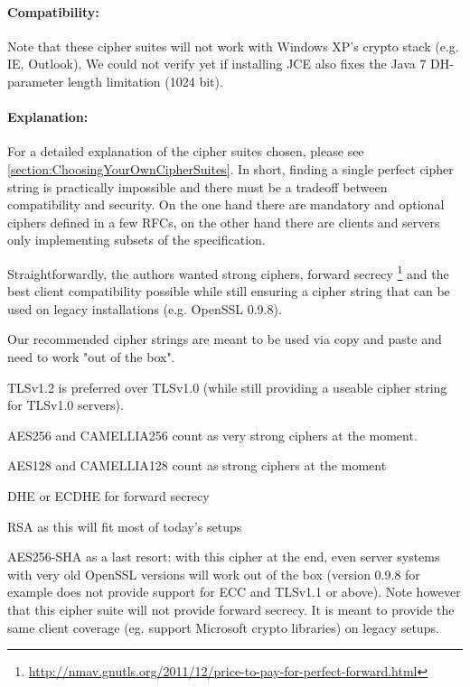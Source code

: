 \paragraph*{Compatibility: }

Note that these cipher suites will not work with Windows XP's crypto stack (e.g. IE, Outlook),
We could not verify yet if installing JCE also fixes the Java 7
DH-parameter length limitation (1024 bit). 

\paragraph*{Explanation: }

For a detailed explanation of the cipher suites chosen, please see
\ref{section:ChoosingYourOwnCipherSuites}. In short, finding a single perfect cipher
string is practically impossible and there must be a tradeoff between compatibility and security.
On the one hand there are mandatory and optional ciphers defined in a few RFCs, 
on the other hand there are clients and servers only implementing subsets of the 
specification.

Straightforwardly, the authors wanted strong ciphers, forward secrecy
\footnote{\url{http://nmav.gnutls.org/2011/12/price-to-pay-for-perfect-forward.html}}
and the best client compatibility possible while still ensuring a cipher string that can be
used on legacy installations (e.g. OpenSSL 0.9.8).

Our recommended cipher strings are meant to be used via copy and paste and need to work
"out of the box".

\begin{itemize*}
  \item TLSv1.2 is preferred over TLSv1.0 (while still providing a useable cipher
      string for TLSv1.0 servers).
  \item AES256 and CAMELLIA256 count as very strong ciphers at the moment.
  \item AES128 and CAMELLIA128 count as strong ciphers at the moment
  \item DHE or ECDHE for forward secrecy
  \item RSA as this will fit most of today's setups
  \item AES256-SHA as a last resort: with this cipher at the end, even server
      systems with very old OpenSSL versions will work out of the box (version 0.9.8 for example does not
      provide support for ECC and TLSv1.1 or above). \newline
      Note however that this cipher suite will not provide forward secrecy. It
      is meant to provide the same client coverage (eg. support Microsoft crypto
      libraries) on legacy setups.
\end{itemize*}
